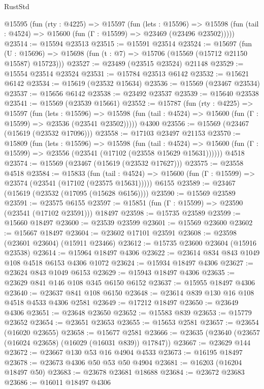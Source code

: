 \begin{lexlean}{RustStd}
\begin{coremodule}
  @15595
    (fun (rty : @4225) =>
    @15597
      (fun (lets : @15596) =>
      @15598 (fun (tail : @4524) => @15600 (fun (Γ : @15599) => @23469 (@23496 @23502)))))
@23514 := @15594 @23513
@23515 := @15591 @23514
@23524 := @15697
    (fun (U : @15696) => @15698 (fun (t : @7) => @15706 (@15569 (@15712 @21150 @15587) @15723)))
@23527 := @23489 (@23515 @23524) @21148
@23529 := @15554 @23514 @23524
@23531 := @15784 @23513 @6142
@23532 := @15621 @6142
@23534 := @15619 (@23532 @15634)
@23536 := @15569 (@23467 @23534)
@23537 := @15656 @6142
@23538 := @23492 @23537
@23539 := @15640 @23538
@23541 := @15569 (@23539 @15661)
@23552 := @15787
    (fun (rty : @4225) =>
    @15597
      (fun (lets : @15596) =>
      @15598 (fun (tail : @4524) => @15600 (fun (Γ : @15599) => @23536 (@23541 @23502)))))
    @4300
@23556 := @15569 (@23467 (@15619 (@23532 @17096)))
@23558 := @17103 @23497 @21153
@23570 := @15809
    (fun (lets : @15596) =>
    @15598
      (fun (tail : @4524) =>
      @15600 (fun (Γ : @15599) => @23556 (@23541 (@17102 (@23558 @15629 @15631))))))
    @4518
@23574 := @15569 (@23467 (@15619 (@23532 @17627)))
@23575 := @23558 @4518
@23584 := @15833
    (fun (tail : @4524) => @15600 (fun (Γ : @15599) => @23574 (@23541 (@17102 (@23575 @15631)))))
    @6155
@23589 := @23467 (@15619 (@23532 (@17095 (@15628 @6156))))
@23590 := @15569 @23589
@23591 := @23575 @6155
@23597 := @15851 (fun (Γ : @15599) => @23590 (@23541 (@17102 @23591))) @18497
@23598 := @15735 @23589
@23599 := @15660 @18497
@23600 := @23539 @23599
@23601 := @15569 @23600
@23602 := @15667 @18497
@23604 := @23602 @17101 @23591
@23608 := @23598 (@23601 @23604) (@15911 @23466)
@23612 := @15735 @23600 @23604 (@15916 @23538)
@23614 := @15964 @18497 @4306
@23622 := @23614 @834 @843 @1049 @108 @4518 @6153 @4306 @1072
@23624 := @15934 @18497 @4306
@23627 := @23624 @843 @1049 @6153
@23629 := @15943 @18497 @4306
@23635 := @23629 @841 @146 @108 @345 @6150 @6152
@23637 := @15955 @18497 @4306
@23640 := @23637 @841 @108 @6150
@23648 := @23614 @839 @130 @16 @108 @4518 @4533 @4306 @2581
@23649 := @17212 @18497
@23650 := @23649 @4306
@23651 := @23648 @23650
@23652 := @15583 @839
@23653 := @15779 @23652
@23654 := @23651 @23653
@23655 := @15653 @2581
@23657 := @23654 (@16020 @23655)
@23658 := @15677 @2581
@23666 := @23635 (@23640 (@23657 (@16024 @23658) (@16029 (@16031 @839)) @17847))
@23667 := @23629 @144
@23672 := @23667 @130 @53 @16 @4904 @4533
@23673 := @16195 @18497
@23678 := @23673 @4306 @50 @53 @50 @4904
@23681 := @16203 (@16204 @18497 @50)
@23683 := @23678 @23681 @18688
@23684 := @23672 @23683
@23686 := @16011 @18497 @4306

\end{coremodule}
\end{lexlean}
